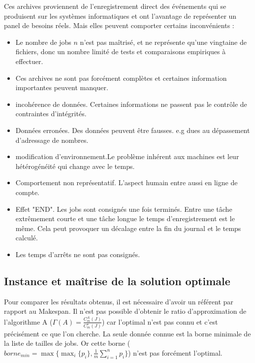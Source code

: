 \documentclass[a4paper,12pt]{report}
\theoremstyle{plain}				%
\theoremstyle{definition}				%
\begin{document}
Ces archives proviennent de l'enregistrement direct des événements qui se produisent sur les systèmes informatiques et ont l'avantage de représenter un panel de besoins réels. 
Mais elles peuvent comporter certains inconvénients : 
\begin{itemize}
	\item Le nombre de jobs $n$ n'est pas maîtrisé, et ne représente qu'une 
	vingtaine de fichiers, donc un nombre limité de tests et comparaisons 
	empiriques à effectuer.
	\item Ces archives ne sont pas forcément complètes et certaines information 
	importantes peuvent manquer.
	\item incohérence de données. Certaines informations ne passent pas le 
	contrôle de contraintes d'intégrités.
	\item Données erronées. Des données peuvent être fausses. 
	e.g dues au dépassement d'adressage de nombres.
	\item modification d'environnement.Le problème inhérent aux machines 
	est leur hétérogénéité qui change avec le temps.
	\item Comportement non représentatif. L'aspect humain entre aussi en ligne de compte.
	\item Effet "END". Les jobs sont consignés une fois terminés. 
	Entre une tâche extrêmement courte et une tâche longue le temps 
	d'enregistrement est le même. Cela peut provoquer un décalage 
	entre la fin du journal et le temps calculé.
	\item Les temps d'arrêts ne sont pas consignés.   
\end{itemize}

\subsection{Instance et maîtrise de la solution optimale}
\label{ssec:instancesMaitriseSolutionOptimale}

Pour comparer les résultats obtenus, il est nécessaire d'avoir un référent par rapport au Makespan. 
Il n'est pas possible d'obtenir le ratio d'approximation de l'algorithme A ($\Gamma(A)=\frac{C_m^A(J)}{C_m^\star(J)}$) car l'optimal n'est pas connu et c'est précisément ce que l'on cherche. 
La seule donnée connue est la borne minimale de la liste de tailles de jobs.
Or cette borne ($borne_{min} = \max \{ \max_i\{p_i\}, \frac{1}{m} \sum_{i=1}^{n} p_i \}$) n'est pas forcément l'optimal.

\bigskip
\end{document}

